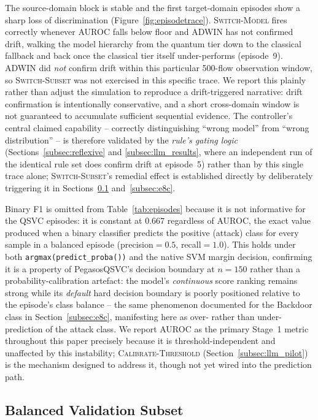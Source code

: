 \documentclass[conference]{IEEEtran}
\begin{document}
The source-domain block is stable and the first target-domain episodes
show a sharp loss of discrimination (Figure~\ref{fig:episodetrace}).
\textsc{Switch-Model} fires correctly whenever AUROC falls below floor and
ADWIN has not confirmed drift, walking the model hierarchy from the
quantum tier down to the classical fallback and back once the classical
tier itself under-performs (episode~9). ADWIN did \emph{not} confirm
drift within this particular 500-flow observation window, so
\textsc{Switch-Subset} was not exercised in this specific trace. We
report this plainly rather than adjust the simulation to reproduce a
drift-triggered narrative: drift confirmation is intentionally
conservative, and a short cross-domain window is not guaranteed to
accumulate sufficient sequential evidence. The controller's central
claimed capability -- correctly distinguishing ``wrong model'' from
``wrong distribution'' -- is therefore validated by the \emph{rule's
gating logic} (Sections~\ref{subsec:reflexive} and
\ref{subsec:llm_results}, where an independent run of the identical rule
set does confirm drift at episode~5) rather than by this single trace
alone; \textsc{Switch-Subset}'s remedial effect is established directly
by deliberately triggering it in Sections~\ref{subsec:e8a}
and~\ref{subsec:e8c}.

Binary F1 is omitted from Table~\ref{tab:episodes} because it is not
informative for the QSVC episodes: it is constant at $0.667$
regardless of AUROC, the
exact value produced when a binary classifier predicts the positive
(attack) class for every sample in a balanced episode
(precision${}=0.5$, recall${}=1.0$). This holds under both
\texttt{argmax(predict\_proba())} and the native SVM margin decision,
confirming it is a property of PegasosQSVC's decision boundary at
$n{=}150$ rather than a probability-calibration artefact: the model's
\emph{continuous} score ranking remains strong while its \emph{default}
hard decision boundary is poorly positioned relative to the episode's
class balance -- the same phenomenon documented for the Backdoor class in
Section~\ref{subsec:e8c}, manifesting here as over- rather than
under-prediction of the attack class. We report AUROC as the primary
Stage~1 metric throughout this paper precisely because it is
threshold-independent and unaffected by this instability;
\textsc{Calibrate-Threshold} (Section~\ref{subsec:llm_pilot}) is the
mechanism designed to address it, though not yet wired into the
prediction path.

\subsection{Balanced Validation Subset}
\label{subsec:e8a}
\end{document}
